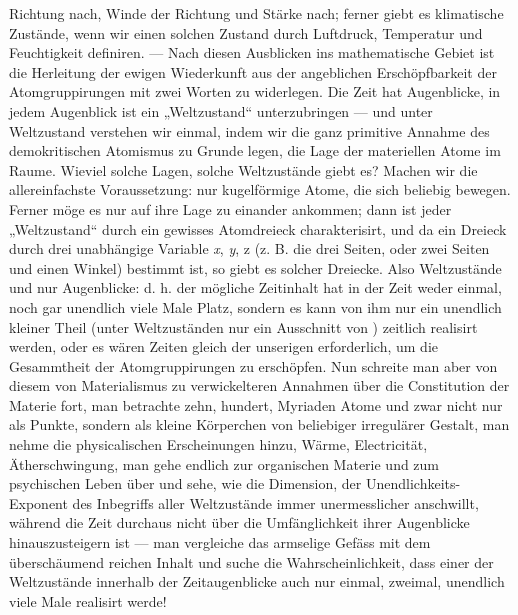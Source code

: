 Richtung nach,  Winde der Richtung und Stärke nach; ferner giebt es  klimatische Zustände, wenn wir einen solchen Zustand durch Luftdruck, Temperatur und Feuchtigkeit definiren. — Nach diesen Ausblicken ins mathematische Gebiet ist die Herleitung der ewigen Wiederkunft aus der angeblichen Erschöpfbarkeit der Atomgruppirungen mit zwei Worten zu widerlegen. Die Zeit hat \Math{\infty} Augenblicke, in jedem Augenblick ist ein „Weltzustand“ unterzubringen — und unter Weltzustand verstehen wir einmal, indem wir die ganz primitive Annahme des demokritischen Atomismus zu Grunde legen, die Lage der materiellen Atome im Raume. Wieviel solche Lagen, solche Weltzustände giebt es? Machen wir die allereinfachste Voraussetzung: nur  kugelförmige Atome, die sich beliebig bewegen. Ferner möge es nur auf ihre  Lage zu einander ankommen; dann ist jeder „Weltzustand“ durch ein gewisses Atomdreieck charakterisirt, und da ein Dreieck durch drei unabhängige Variable \textit{x}, \textit{y}, z (z. B. die drei Seiten, oder zwei Seiten und einen Winkel) bestimmt ist, so giebt es  solcher Dreiecke. Also  Weltzustände und nur \Math{\infty} Augenblicke: d. h. der mögliche Zeitinhalt hat in der Zeit weder einmal, noch gar unendlich viele Male Platz, sondern es kann von ihm nur ein unendlich kleiner Theil (unter  Weltzuständen nur ein Ausschnitt von \Math{\infty}) zeitlich realisirt werden, oder es wären  Zeiten gleich der unserigen erforderlich, um die Gesammtheit der Atomgruppirungen zu erschöpfen. Nun schreite man aber von diesem  von Materialismus zu verwickelteren Annahmen über die Constitution der Materie fort, man betrachte zehn, hundert, Myriaden Atome und zwar nicht nur als Punkte, sondern als kleine Körperchen von beliebiger irregulärer Gestalt, man nehme die physicalischen Erscheinungen hinzu, Wärme, Electricität, Ätherschwingung, man gehe endlich zur organischen Materie und zum psychischen Leben über und sehe, wie die Dimension, der Unendlichkeits-Exponent des Inbegriffs aller Weltzustände immer unermesslicher anschwillt, während die Zeit durchaus nicht über die Umfänglichkeit ihrer \Math{\infty} Augenblicke hinauszusteigern ist — man vergleiche das armselige Gefäss mit dem überschäumend reichen Inhalt und suche die Wahrscheinlichkeit, dass einer der \Math{\infty^\infty} Weltzustände innerhalb der  Zeitaugenblicke auch nur einmal, zweimal, unendlich viele Male realisirt werde!
\par

